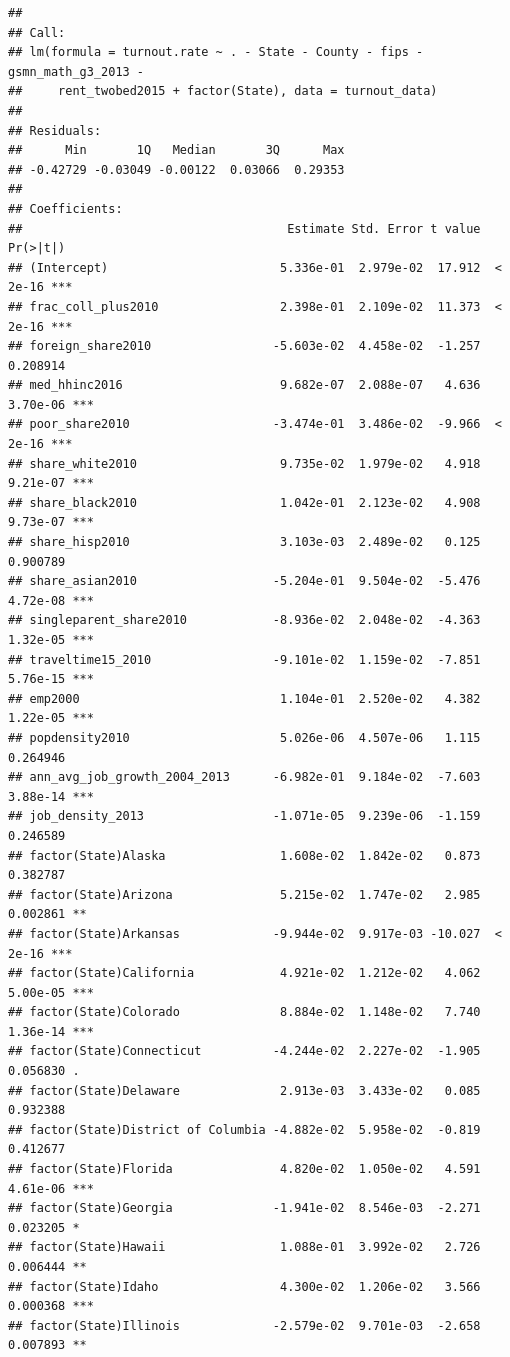 \documentclass[
]{article}
\begin{document}
\begin{verbatim}
## 
## Call:
## lm(formula = turnout.rate ~ . - State - County - fips - gsmn_math_g3_2013 - 
##     rent_twobed2015 + factor(State), data = turnout_data)
## 
## Residuals:
##      Min       1Q   Median       3Q      Max 
## -0.42729 -0.03049 -0.00122  0.03066  0.29353 
## 
## Coefficients:
##                                     Estimate Std. Error t value Pr(>|t|)    
## (Intercept)                        5.336e-01  2.979e-02  17.912  < 2e-16 ***
## frac_coll_plus2010                 2.398e-01  2.109e-02  11.373  < 2e-16 ***
## foreign_share2010                 -5.603e-02  4.458e-02  -1.257 0.208914    
## med_hhinc2016                      9.682e-07  2.088e-07   4.636 3.70e-06 ***
## poor_share2010                    -3.474e-01  3.486e-02  -9.966  < 2e-16 ***
## share_white2010                    9.735e-02  1.979e-02   4.918 9.21e-07 ***
## share_black2010                    1.042e-01  2.123e-02   4.908 9.73e-07 ***
## share_hisp2010                     3.103e-03  2.489e-02   0.125 0.900789    
## share_asian2010                   -5.204e-01  9.504e-02  -5.476 4.72e-08 ***
## singleparent_share2010            -8.936e-02  2.048e-02  -4.363 1.32e-05 ***
## traveltime15_2010                 -9.101e-02  1.159e-02  -7.851 5.76e-15 ***
## emp2000                            1.104e-01  2.520e-02   4.382 1.22e-05 ***
## popdensity2010                     5.026e-06  4.507e-06   1.115 0.264946    
## ann_avg_job_growth_2004_2013      -6.982e-01  9.184e-02  -7.603 3.88e-14 ***
## job_density_2013                  -1.071e-05  9.239e-06  -1.159 0.246589    
## factor(State)Alaska                1.608e-02  1.842e-02   0.873 0.382787    
## factor(State)Arizona               5.215e-02  1.747e-02   2.985 0.002861 ** 
## factor(State)Arkansas             -9.944e-02  9.917e-03 -10.027  < 2e-16 ***
## factor(State)California            4.921e-02  1.212e-02   4.062 5.00e-05 ***
## factor(State)Colorado              8.884e-02  1.148e-02   7.740 1.36e-14 ***
## factor(State)Connecticut          -4.244e-02  2.227e-02  -1.905 0.056830 .  
## factor(State)Delaware              2.913e-03  3.433e-02   0.085 0.932388    
## factor(State)District of Columbia -4.882e-02  5.958e-02  -0.819 0.412677    
## factor(State)Florida               4.820e-02  1.050e-02   4.591 4.61e-06 ***
## factor(State)Georgia              -1.941e-02  8.546e-03  -2.271 0.023205 *  
## factor(State)Hawaii                1.088e-01  3.992e-02   2.726 0.006444 ** 
## factor(State)Idaho                 4.300e-02  1.206e-02   3.566 0.000368 ***
## factor(State)Illinois             -2.579e-02  9.701e-03  -2.658 0.007893 ** 

\end{verbatim}
\end{document}
